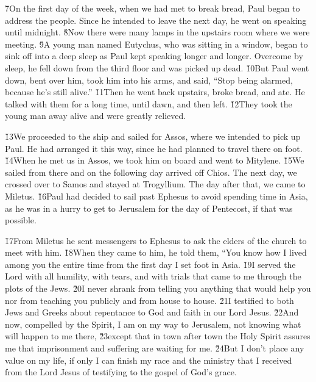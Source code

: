 \v{7}On the first day of the week, when we had met to break bread, Paul began to address the people. Since he intended to leave the next day, he went on speaking until midnight. \v{8}Now there were many lamps in the upstairs room where we were meeting. \v{9}A young man named Eutychus, who was sitting in a window, began to sink off into a deep sleep as Paul kept speaking longer and longer. Overcome by sleep, he fell down from the third floor and was picked up dead. \v{10}But Paul went down, bent over him, took him into his arms, and said, ``Stop being alarmed, because he's still alive.'' \v{11}Then he went back upstairs, broke bread, and ate. He talked with them for a long time, until dawn, and then left. \v{12}They took the young man away alive and were greatly relieved.

\v{13}We proceeded to the ship and sailed for Assos, where we intended to pick up Paul. He had arranged it this way, since he had planned to travel there on foot. \v{14}When he met us in Assos, we took him on board and went to Mitylene. \v{15}We sailed from there and on the following day arrived off Chios. The next day, we crossed over to Samos and stayed at Trogyllium. The day after that, we came to Miletus. \v{16}Paul had decided to sail past Ephesus to avoid spending time in Asia, as he was in a hurry to get to Jerusalem for the day of Pentecost, if that was possible.

\v{17}From Miletus he sent messengers to Ephesus to ask the elders of the church to meet with him. \v{18}When they came to him, he told them, ``You know how I lived among you the entire time from the first day I set foot in Asia. \v{19}I served the Lord with all humility, with tears, and with trials that came to me through the plots of the Jews. \v{20}I never shrank from telling you anything that would help you nor from teaching you publicly and from house to house. \v{21}I testified to both Jews and Greeks about repentance to God and faith in our Lord Jesus. \v{22}And now, compelled by the Spirit, I am on my way to Jerusalem, not knowing what will happen to me there, \v{23}except that in town after town the Holy Spirit assures me that imprisonment and suffering are waiting for me. \v{24}But I don't place any value on my life, if only I can finish my race and the ministry that I received from the Lord Jesus of testifying to the gospel of God's grace.

